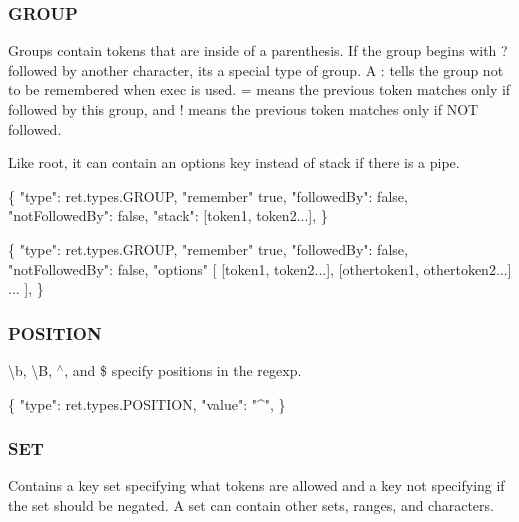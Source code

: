 \subsubsection*{G\+R\+O\+UP}

Groups contain tokens that are inside of a parenthesis. If the group begins with {\ttfamily ?} followed by another character, it\textquotesingle{}s a special type of group. A \textquotesingle{}\+:\textquotesingle{} tells the group not to be remembered when {\ttfamily exec} is used. \textquotesingle{}=\textquotesingle{} means the previous token matches only if followed by this group, and \textquotesingle{}!\textquotesingle{} means the previous token matches only if N\+OT followed.

Like root, it can contain an {\ttfamily options} key instead of {\ttfamily stack} if there is a pipe.


\begin{DoxyCode}
\{
  "type": ret.types.GROUP,
  "remember" true,
  "followedBy": false,
  "notFollowedBy": false,
  "stack": [token1, token2...],
\}
\end{DoxyCode}



\begin{DoxyCode}
\{
  "type": ret.types.GROUP,
  "remember" true,
  "followedBy": false,
  "notFollowedBy": false,
  "options" [
    [token1, token2...],
    [othertoken1, othertoken2...]
    ...
  ],
\}
\end{DoxyCode}


\subsubsection*{P\+O\+S\+I\+T\+I\+ON}

{\ttfamily \textbackslash{}b}, {\ttfamily \textbackslash{}B}, {\ttfamily $^\wedge$}, and {\ttfamily \$} specify positions in the regexp.


\begin{DoxyCode}
\{
  "type": ret.types.POSITION,
  "value": "^",
\}
\end{DoxyCode}


\subsubsection*{S\+ET}

Contains a key {\ttfamily set} specifying what tokens are allowed and a key {\ttfamily not} specifying if the set should be negated. A set can contain other sets, ranges, and characters.


